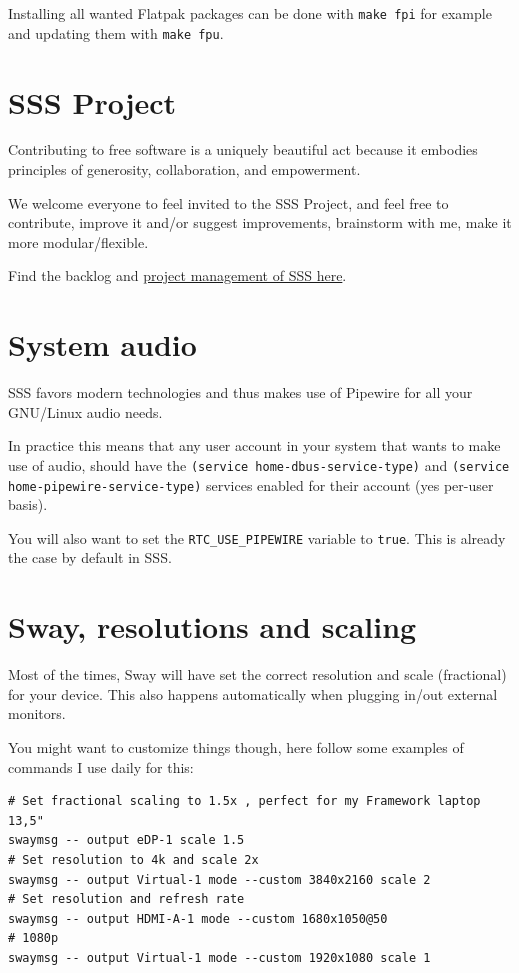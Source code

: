 \documentclass[11pt]{article}
\begin{document}
Installing all wanted Flatpak packages can be done with \texttt{make fpi} for example and updating them with \texttt{make fpu}.

\section{SSS Project}
\label{sec:org3ccb09a}


Contributing to free software is a uniquely beautiful act because it embodies principles of generosity, collaboration, and empowerment.

We welcome everyone to feel invited to the SSS Project, and feel free to contribute, improve it and/or suggest improvements, brainstorm with me, make it more modular/flexible.

Find the backlog and \href{../project-management.org}{project management of SSS here}.

\section{System audio}
\label{sec:org5f2415f}

SSS favors modern technologies and thus makes use of Pipewire for all your GNU/Linux audio needs.

In practice this means that any user account in your system that wants to make use of audio, should have the  \texttt{(service home-dbus-service-type)} and \texttt{(service home-pipewire-service-type)} services enabled for their account (yes per-user basis).

You will also want to set the \texttt{RTC\_USE\_PIPEWIRE} variable to \texttt{true}. This is already the case by default in SSS.

\section{Sway, resolutions and scaling}
\label{sec:orgcd594bd}

Most of the times, Sway will have set the correct resolution and scale (fractional) for your device. This also happens automatically when plugging in/out external monitors.

You might want to customize things though, here follow some examples of commands I use daily for this:

\begin{verbatim}
# Set fractional scaling to 1.5x , perfect for my Framework laptop 13,5"
swaymsg -- output eDP-1 scale 1.5
# Set resolution to 4k and scale 2x
swaymsg -- output Virtual-1 mode --custom 3840x2160 scale 2
# Set resolution and refresh rate
swaymsg -- output HDMI-A-1 mode --custom 1680x1050@50
# 1080p
swaymsg -- output Virtual-1 mode --custom 1920x1080 scale 1
\end{verbatim}
\end{document}
